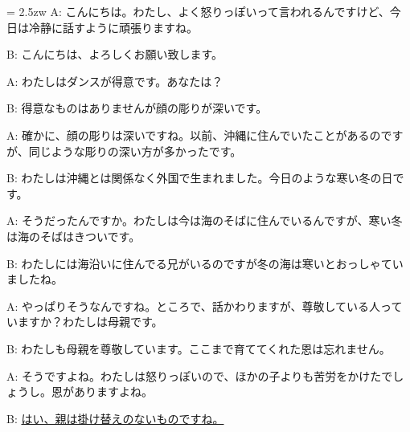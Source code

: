 \documentclass[11pt]{amsart}
\title{}
\author{}
\newenvironment{hangall}[1]{\hangindent = 2.5zw\everypar{\hangindent = 2.5zw}}{}
\begin{document}
\maketitle
\begin{hangall}{}%
A: こんにちは。わたし、よく怒りっぽいって言われるんですけど、今日は冷静に話すように頑張りますね。

B: こんにちは、よろしくお願い致します。

A: わたしはダンスが得意です。あなたは？

B: 得意なものはありませんが顔の彫りが深いです。

A: 確かに、顔の彫りは深いですね。以前、沖縄に住んでいたことがあるのですが、同じような彫りの深い方が多かったです。

B: わたしは沖縄とは関係なく外国で生まれました。今日のような寒い冬の日です。

A: そうだったんですか。わたしは今は海のそばに住んでいるんですが、寒い冬は海のそばはきついです。

B: わたしには海沿いに住んでる兄がいるのですが冬の海は寒いとおっしゃていましたね。

A: やっぱりそうなんですね。ところで、話かわりますが、尊敬している人っていますか？わたしは母親です。

B: わたしも母親を尊敬しています。ここまで育ててくれた恩は忘れません。

A: そうですよね。わたしは怒りっぽいので、ほかの子よりも苦労をかけたでしょうし。恩がありますよね。

B: \ul{はい、親は掛け替えのないものですね。}\end{hangall}
\end{document}
